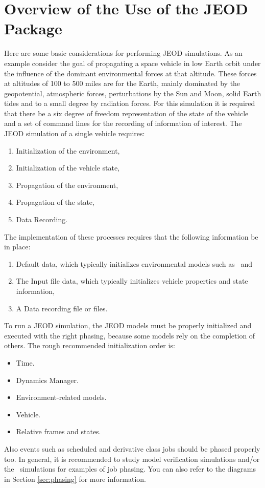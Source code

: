 \section{Overview of the Use of the JEOD Package}
Here are some basic considerations for performing JEOD simulations. As an example consider the goal of propagating a space vehicle in low Earth orbit under the influence of the dominant environmental forces at that altitude. These forces at altitudes of 100 to 500 miles are for the Earth, mainly dominated by the geopotential, atmospheric forces, perturbations by the Sun and Moon, solid Earth tides and to a small degree by radiation forces. For this simulation it is required that there be a six degree of freedom representation of the state of the vehicle and a set of command lines for the recording of information of interest.  The JEOD simulation of a single vehicle requires:
\begin{enumerate}
\item Initialization of the environment,
\item Initialization of the vehicle state,
\item Propagation of the environment,
\item Propagation of the state,
\item Data Recording.
\end{enumerate}
The implementation of these processes requires that the following information be in place:
\begin{enumerate}
\item Default data, which typically initializes environmental models such as \ and \,
\item The Input file data, which typically initializes vehicle properties and state information,
\item A Data recording file or files.
\end{enumerate}

To run a JEOD simulation, the JEOD models must be properly initialized and executed with the right phasing, because some models rely on the completion of others. The rough recommended initialization order is:
\begin{itemize}
\item Time.
\item Dynamics Manager.
\item Environment-related models.
\item Vehicle.
\item Relative frames and states.
\end{itemize}
Also events such as scheduled and derivative class jobs should be phased properly too. In general, it is recommended to study model verification simulations and/or the  \hyperTutorial\ simulations for examples of job phasing. You can also refer to the diagrams in Section \ref{sec:phasing} for more information.
